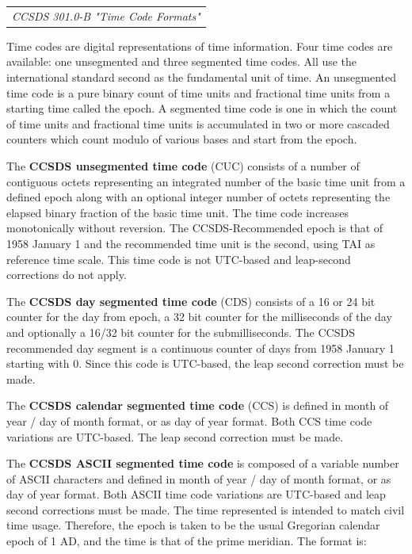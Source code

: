 \begin{tabular}{l}
\textit{CCSDS 301.0-B "Time Code Formats" \cite{CCSDS-301.0-B}} \\
\end{tabular}

Time codes are digital representations of time information. Four time codes are available: one unsegmented and three segmented time codes. All use the international standard second as the fundamental unit of time. An unsegmented time code is a pure binary count of time units and fractional time units from a starting time called the epoch. A segmented time code is one in which the count of time units and fractional time units is accumulated in two or more cascaded counters which count modulo of various bases and start from the epoch. 

The \textbf{CCSDS unsegmented time code} (CUC) consists of a number of contiguous octets representing an integrated  number of the basic time unit from a defined epoch along with an optional integer number of octets representing the elapsed binary fraction of the basic time unit. The time code increases monotonically without reversion. The CCSDS-Recommended epoch is that of 1958 January 1 and the recommended time unit is the second, using TAI as reference time scale. This time code is not UTC-based and leap-second corrections do not apply. 

The \textbf{CCSDS day segmented time code} (CDS) consists of a 16 or 24 bit counter for the day from epoch, a 32 bit counter for the milliseconds of the day and optionally a 16/32 bit counter for the submilliseconds. The CCSDS recommended day segment is a continuous counter of days from 1958 January 1 starting with 0. Since this code is UTC-based, the leap second correction must be made. 

The \textbf{CCSDS calendar segmented time code} (CCS) is defined in month of year / day of month format, or as day of year format. Both CCS time code variations are UTC-based. The leap second correction must be made.

The \textbf{CCSDS ASCII segmented  time code} is composed of a variable number of ASCII 
characters and defined in month of year / day of month format, or as day of year format. Both ASCII time code variations are UTC-based and leap second corrections must be made. The time represented is intended to match civil time usage.  Therefore, the epoch is taken to be the usual Gregorian calendar epoch of 1 AD, and the time is that of the prime meridian. The format is:

